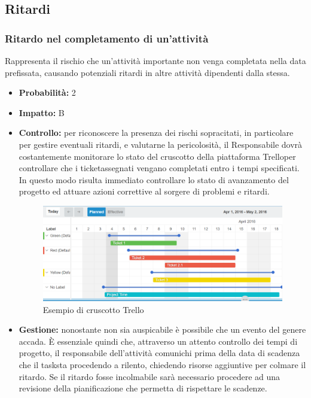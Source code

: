 \documentclass[a4paper,11pt]{article}
\begin{document}
	\subsection{Ritardi} \label{risk:ritardi }
		\subsubsection{Ritardo nel completamento di un'attività}
		Rappresenta il rischio che un'attività importante non venga completata nella data prefissata, causando potenziali ritardi in altre attività dipendenti dalla stessa.
		\begin{itemize}
		\item \textbf{Probabilità:} 2
		\item \textbf{Impatto:} B
		\item \textbf{Controllo:} per riconoscere la presenza dei rischi sopracitati, in particolare per gestire eventuali ritardi, e valutarne la pericolosità, il Responsabile dovrà costantemente monitorare lo stato del cruscotto della piattaforma Trello\addglos per controllare che i ticket\addglos assegnati vengano completati entro i tempi specificati. In questo modo risulta immediato controllare lo stato di avanzamento del progetto ed attuare azioni correttive al sorgere di problemi e ritardi.
		\begin{figure}[h!]
		\begin{center}
			\hspace{1cm}
			\includegraphics[scale=0.35]{../Images/ticketing-example.png}
			\caption{Esempio di cruscotto Trello}	
		\end{center}
		\end{figure}	
		\item \textbf{Gestione:} nonostante non sia auspicabile è possibile che un evento del genere accada. È essenziale quindi che, attraverso un attento controllo dei tempi di progetto, il responsabile dell'attività comunichi prima della data di scadenza che  il task\addglos sta procedendo a rilento, chiedendo risorse aggiuntive per colmare il ritardo. Se il ritardo fosse incolmabile sarà necessario procedere ad una revisione della pianificazione che permetta di rispettare le scadenze.

\end{itemize}
\end{document}
